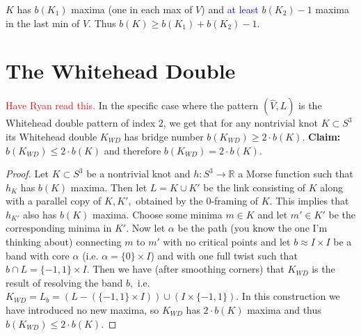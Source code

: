 \documentclass[11pt, oneside]{article}
\begin{document}
$K$ has $b(K_{1})$ maxima (one in each max of $V$) and \textcolor{blue}{at least} $b(K_{2}) - 1$ maxima in the last min of $V.$ Thus $b(K) \geq b(K_{1}) + b(K_{2}) - 1.$
 
\section*{The Whitehead Double}
\textcolor{red}{Have Ryan read this.} In the specific case where the pattern $(\hat{V}, L)$ is the Whitehead double pattern of index 2, we get that for any nontrivial knot $K \subset  S^{3}$ its Whitehead double $K_{WD}$ has bridge number $b(K_{WD}) \geq 2\cdot b(K).$ \textbf{Claim:} $b(K_{WD}) \leq 2\cdot b(K)$ and therefore $b(K_{WD}) = 2 \cdot b(K).$ \begin{proof} Let $K \subset S^{3}$ be a nontrivial knot and $h: S^{3} \rightarrow \mathbb{R}$ a Morse function such that $h_{K}$ has $b(K)$ maxima. Then let $L = K \cup K'$ be the link consisting of $K$ along with a parallel copy of $K, K',$ obtained by the 0-framing of $K.$ This implies that $h_{K'}$ also has $b(K)$ maxima. Choose some minima $m \in K$ and let $m' \in K'$ be the corresponding minima in $K'.$ Now let $\alpha$ be the path (you know the one I'm thinking about) connecting $m$ to $m'$ with no critical points and let $b \approx I \times I$ be a band with core $\alpha$ (i.e. $\alpha = \{0\} \times I$) and with one full twist such that $b \cap L = \{-1, 1\} \times I.$ Then we have (after smoothing corners) that $K_{WD}$ is the result of resolving the band $b,$ i.e. $K_{WD} = L_{b} =( L- (\{-1, 1\} \times I)) \cup (I \times \{-1, 1\}).$ In this construction we have introduced no new maxima, so $K_{WD}$ has $2 \cdot b(K)$ maxima and thus $b(K_{WD}) \leq 2 \cdot b(K).$

\end{proof}
\end{document}
